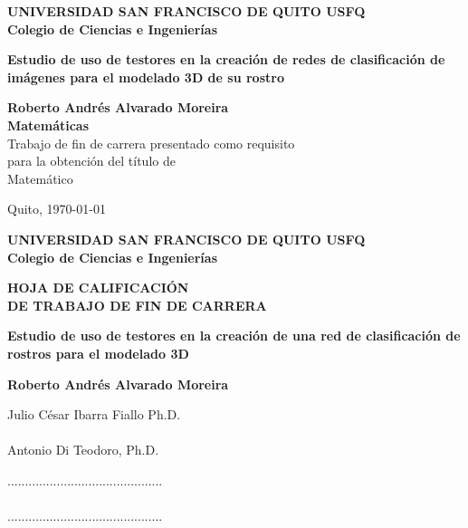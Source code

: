\documentclass[a4paper, 12pt]{report}
\begin{document}
\pagestyle{empty}
\begin{center}
\Large\textbf{UNIVERSIDAD SAN FRANCISCO DE QUITO USFQ}\\
\vspace{1cm}
\large\textbf{Colegio de Ciencias e Ingenierías}

\vspace{4cm}
\begin{Large}
  \textbf{Estudio de uso de testores en la creación de redes de clasificación de imágenes para el modelado 3D de su rostro}
\end{Large}

\vspace{3cm}
\Large\textbf{Roberto Andrés Alvarado Moreira}\\
\vspace{0.5cm}
\Large\textbf{Matemáticas}\\

\vspace{1.5cm}
\large
Trabajo de fin de carrera presentado como requisito \\
para la obtención del título de \\
Matemático

\vfill
\normalsize Quito, \today


\setcounter{page}{1}
\thispagestyle{empty}
\end{center}

\newpage

\thispagestyle{empty}
\begin{center}

\Large\textbf{UNIVERSIDAD SAN FRANCISCO DE QUITO USFQ}\\
\vspace{0.3cm}
\normalsize\textbf{Colegio de Ciencias e Ingenierías}

\vspace{1.5cm}
\normalsize\textbf{HOJA DE CALIFICACIÓN\\
 DE TRABAJO DE FIN DE CARRERA}

\vspace{1.5cm}
\normalsize\textbf{Estudio de uso de testores en la creación de una red de clasificación de rostros para el modelado 3D}

\vspace{1cm}
\large\textbf{Roberto Andrés Alvarado Moreira}
\end{center}

\vspace{4cm}
\begin{minipage}{0.5\linewidth}   
  \normalsize Julio César Ibarra Fiallo Ph.D. 
  \vspace{1.4cm}\\
  \\
  \normalsize Antonio Di Teodoro, Ph.D.\\
\end{minipage}
\begin{minipage}{0.3\linewidth}
  \normalsize ............................................\\
  \vspace{1.2cm}\\
  \normalsize ............................................
\end{minipage}
\end{document}
